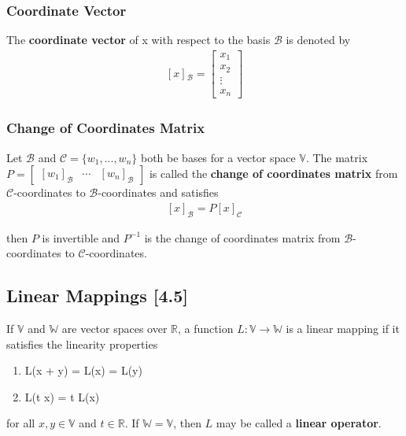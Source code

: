 \documentclass[a4paper,9pt]{extarticle}
\begin{document}
\begin{multicols*}{2}
\subsubsection{Coordinate Vector}
The \textbf{coordinate vector} of x with respect to the basis $\mathcal{B}$ is denoted by
\begin{equation} \label{4.3-2}
    \begin{split}
        [x]{_\mathcal{B}} = \begin{bmatrix}x_1 \\ x_2 \\ \vdots \\ x_n \end{bmatrix}
    \end{split}
\end{equation}


\subsubsection{Change of Coordinates Matrix}
Let $\mathcal{B}$ and $\mathcal{C} = \{w_1, ..., w_n\}$ both be bases for a vector space $\mathbb{V}$. The matrix $P = \begin{bmatrix}[w_1]_{\mathcal{B}} & \cdots & [w_n]_{\mathcal{B}}\end{bmatrix}$ is called the \textbf{change of coordinates matrix} from $\mathcal{C}$-coordinates to $\mathcal{B}$-coordinates and satisfies 
\begin{equation} \label{4.3-3}
    \begin{split}
        [x]_{\mathcal{B}} = P [x]_{\mathcal{C}}
    \end{split}
\end{equation}

\noindent then $P$ is invertible and $P^{-1}$ is the change of coordinates matrix from $\mathcal{B}$-coordinates to $\mathcal{C}$-coordinates.


\subsection{Linear Mappings [4.5]}
If $\mathbb{V}$ and $\mathbb{W}$ are vector spaces over $\mathbb{R}$, a function $L : \mathbb{V} \to \mathbb{W}$ is a linear mapping if it satisfies the linearity properties
\begin{enumerate}[label=\bfseries L\arabic*] \itemsep0pt \parskip0pt 
    \item L(x + y) = L(x) = L(y)
    \item L(t x) = t L(x)
\end{enumerate}
for all $x, y \in \mathbb{V}$ and $t \in \mathbb{R}$. If $\mathbb{W} = \mathbb{V}$, then $L$ may be called a \textbf{linear operator}.


\end{multicols*}
\end{document}
